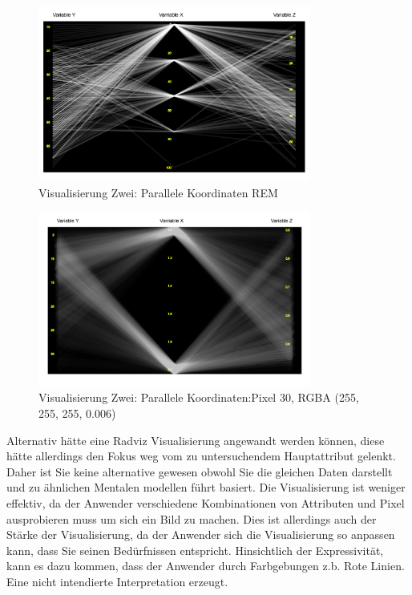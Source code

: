 \documentclass[usegeometry=true]{scrartcl}
\begin{document}
\begin{figure}[h]
  \centering
  \includegraphics [width = 0.8\textwidth]{RoengtenBSP.JPG}
  \caption{Visualisierung Zwei:  Parallele Koordinaten REM  }
\end{figure}



 
\begin{figure}[h]
  \centering
  \includegraphics [width = 0.8\textwidth]{ParalleleBSPPixel.JPG}
  \caption{Visualisierung Zwei: Parallele Koordinaten:Pixel 30, RGBA (255, 255, 255, 0.006) }
\end{figure}

Alternativ hätte eine Radviz Visualisierung angewandt werden können, diese hätte allerdings den Fokus weg vom zu untersuchendem Hauptattribut gelenkt. Daher ist Sie keine alternative gewesen obwohl Sie die gleichen Daten darstellt und zu ähnlichen Mentalen modellen führt basiert.
Die Visualisierung ist weniger effektiv, da der Anwender verschiedene Kombinationen von Attributen und Pixel ausprobieren muss um sich ein Bild zu machen. Dies ist allerdings auch der Stärke der Visualisierung, da der Anwender sich die Visualisierung so anpassen kann, dass Sie seinen Bedürfnissen entspricht. Hinsichtlich der Expressivität, kann es dazu kommen, dass der Anwender durch Farbgebungen z.b. Rote Linien. Eine nicht intendierte Interpretation erzeugt.
\end{document}
